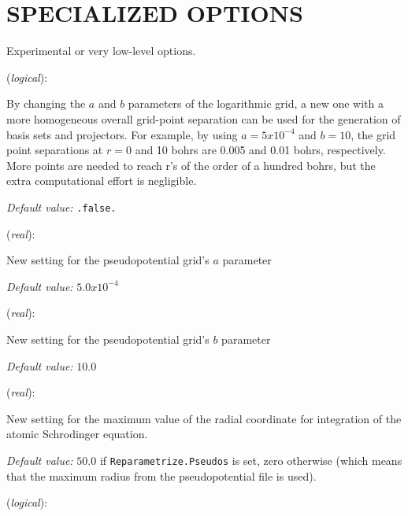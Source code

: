 \documentclass[11pt]{article}
\begin{document}
\section{SPECIALIZED OPTIONS}

Experimental or very low-level options.

\begin{description}
\itemsep 10pt
\parsep 0pt

\item[{\bf Reparametrize.Pseudos}] ({\it logical}): 

By changing the $a$ and $b$ parameters of the logarithmic grid, a new one
with a more homogeneous overall grid-point separation can be used for
the generation of basis sets and projectors. For example, by using
$a=5x10^{-4}$ and $b=10$, the grid point separations at $r=0$ and 10 bohrs are
0.005 and 0.01 bohrs, respectively. More points are needed to reach r's of
the order of a hundred bohrs, but the extra computational effort is negligible.

{\it Default value:} { \tt .false.}

\item[{\bf New.A.Parameter}] ({\it real}):

New setting for the pseudopotential grid's $a$ parameter

{\it Default value:} { $5.0x10^{-4}$}

\item[{\bf New.B.Parameter}] ({\it real}):

New setting for the pseudopotential grid's $b$ parameter

{\it Default value:} { $10.0$}

\item[{\bf Rmax.Radial.Grid}] ({\it real}):

New setting for the maximum value of the radial coordinate for
integration of the atomic Schrodinger equation.

{\it Default value:} { $50.0$} if {\tt Reparametrize.Pseudos} is set,
zero otherwise (which means that the maximum radius from the pseudopotential
file is used).

\item[{\bf Restricted.Radial.Grid}] ({\it logical}): 


\end{description}
\end{document}
